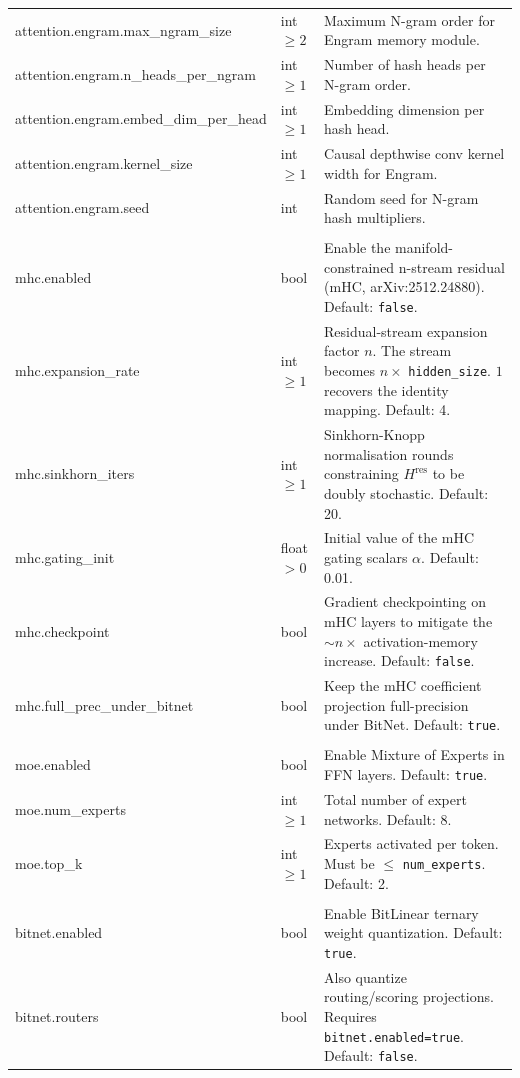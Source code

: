 \begin{longtable}{>{\ttfamily\footnotesize\raggedright\arraybackslash}p{5.6cm}>{\raggedright\arraybackslash}p{2.4cm}>{\raggedright\arraybackslash}p{6.9cm}}
\midrule
attention.engram.max\_ngram\_size & int $\ge 2$ & Maximum N-gram order for Engram memory module. \\
attention.engram.n\_heads\_per\_ngram & int $\ge 1$ & Number of hash heads per N-gram order. \\
attention.engram.embed\_dim\_per\_head & int $\ge 1$ & Embedding dimension per hash head. \\
attention.engram.kernel\_size & int $\ge 1$ & Causal depthwise conv kernel width for Engram. \\
attention.engram.seed & int & Random seed for N-gram hash multipliers. \\
\midrule
\multicolumn{3}{l}{\textit{model.mhc.*}} \\
\midrule
mhc.enabled & bool & Enable the manifold-constrained n-stream residual (mHC, arXiv:2512.24880). Default: \texttt{false}. \\
mhc.expansion\_rate & int $\ge 1$ & Residual-stream expansion factor $n$. The stream becomes $n \times$ \texttt{hidden\_size}. $1$ recovers the identity mapping. Default: 4. \\
mhc.sinkhorn\_iters & int $\ge 1$ & Sinkhorn-Knopp normalisation rounds constraining $H^{\text{res}}$ to be doubly stochastic. Default: 20. \\
mhc.gating\_init & float $> 0$ & Initial value of the mHC gating scalars $\alpha$. Default: 0.01. \\
mhc.checkpoint & bool & Gradient checkpointing on mHC layers to mitigate the $\sim n\times$ activation-memory increase. Default: \texttt{false}. \\
mhc.full\_prec\_under\_bitnet & bool & Keep the mHC coefficient projection full-precision under BitNet. Default: \texttt{true}. \\
\midrule
\multicolumn{3}{l}{\textit{model.moe.*}} \\
\midrule
moe.enabled & bool & Enable Mixture of Experts in FFN layers. Default: \texttt{true}. \\
moe.num\_experts & int $\ge 1$ & Total number of expert networks. Default: 8. \\
moe.top\_k & int $\ge 1$ & Experts activated per token. Must be $\le$ \texttt{num\_experts}. Default: 2. \\
\midrule
\multicolumn{3}{l}{\textit{model.bitnet.*}} \\
\midrule
bitnet.enabled & bool & Enable BitLinear ternary weight quantization. Default: \texttt{true}. \\
bitnet.routers & bool & Also quantize routing/scoring projections. Requires \texttt{bitnet.enabled=true}. Default: \texttt{false}. \\

\end{longtable}
